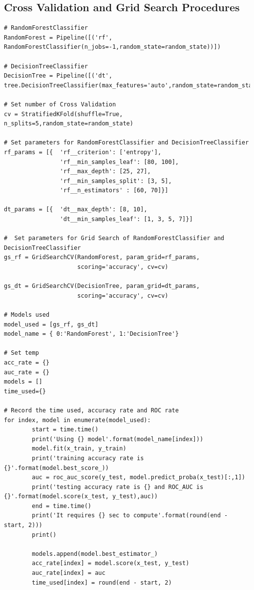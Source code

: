 \documentclass[11pt,a4paper]{article}
\begin{document}
    \subsection{Cross Validation and Grid Search Procedures}
\begin{lstlisting}
# RandomForestClassifier
RandomForest = Pipeline([('rf', RandomForestClassifier(n_jobs=-1,random_state=random_state))])

# DecisionTreeClassifier
DecisionTree = Pipeline([('dt', tree.DecisionTreeClassifier(max_features='auto',random_state=random_state))])

# Set number of Cross Validation
cv = StratifiedKFold(shuffle=True, n_splits=5,random_state=random_state)

# Set parameters for RandomForestClassifier and DecisionTreeClassifier
rf_params = [{  'rf__criterion': ['entropy'],
                'rf__min_samples_leaf': [80, 100],
                'rf__max_depth': [25, 27],
                'rf__min_samples_split': [3, 5],
                'rf__n_estimators' : [60, 70]}]

dt_params = [{  'dt__max_depth': [8, 10],
                'dt__min_samples_leaf': [1, 3, 5, 7]}]

#  Set parameters for Grid Search of RandomForestClassifier and DecisionTreeClassifier
gs_rf = GridSearchCV(RandomForest, param_grid=rf_params,
                     scoring='accuracy', cv=cv)

gs_dt = GridSearchCV(DecisionTree, param_grid=dt_params,
                     scoring='accuracy', cv=cv)

# Models used
model_used = [gs_rf, gs_dt]
model_name = { 0:'RandomForest', 1:'DecisionTree'}

# Set temp
acc_rate = {}
auc_rate = {}
models = []
time_used={}

# Record the time used, accuracy rate and ROC rate
for index, model in enumerate(model_used):
        start = time.time()
        print('Using {} model'.format(model_name[index]))
        model.fit(x_train, y_train)
        print('training accuracy rate is {}'.format(model.best_score_))
        auc = roc_auc_score(y_test, model.predict_proba(x_test)[:,1])
        print('testing accuracy rate is {} and ROC_AUC is {}'.format(model.score(x_test, y_test),auc))
        end = time.time()
        print('It requires {} sec to compute'.format(round(end - start, 2)))
        print()
        
        models.append(model.best_estimator_)
        acc_rate[index] = model.score(x_test, y_test)
        auc_rate[index] = auc
        time_used[index] = round(end - start, 2)
\end{lstlisting}
\end{document}
